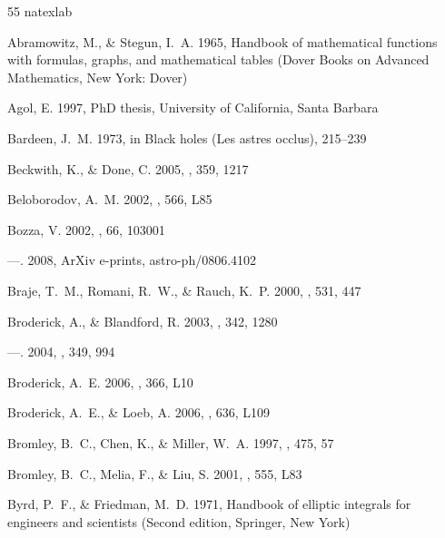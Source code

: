 \documentclass[apj]{emulateapj}
\begin{document}
\begin{thebibliography}{55}
\expandafter\ifx\csname natexlab\endcsname\relax\def\natexlab#1{#1}\fi

{Abramowitz}, M., \& {Stegun}, I.~A. 1965, {Handbook of mathematical functions
  with formulas, graphs, and mathematical tables} (Dover Books on Advanced
  Mathematics, New York: Dover)

{Agol}, E. 1997, PhD thesis, University of California, Santa Barbara

{Bardeen}, J.~M. 1973, in Black holes (Les astres occlus), 215--239

{Beckwith}, K., \& {Done}, C. 2005, \mnras, 359, 1217

{Beloborodov}, A.~M. 2002, \apjl, 566, L85

{Bozza}, V. 2002, \prd, 66, 103001

---. 2008, ArXiv e-prints, astro-ph/0806.4102

{Braje}, T.~M., {Romani}, R.~W., \& {Rauch}, K.~P. 2000, \apj, 531, 447

{Broderick}, A., \& {Blandford}, R. 2003, \mnras, 342, 1280

---. 2004, \mnras, 349, 994

{Broderick}, A.~E. 2006, \mnras, 366, L10

{Broderick}, A.~E., \& {Loeb}, A. 2006, \apjl, 636, L109

{Bromley}, B.~C., {Chen}, K., \& {Miller}, W.~A. 1997, \apj, 475, 57

{Bromley}, B.~C., {Melia}, F., \& {Liu}, S. 2001, \apjl, 555, L83

{Byrd}, P.~F., \& {Friedman}, M.~D. 1971, {Handbook of elliptic integrals for
  engineers and scientists} (Second edition, Springer, New York)


\end{thebibliography}
\end{document}

